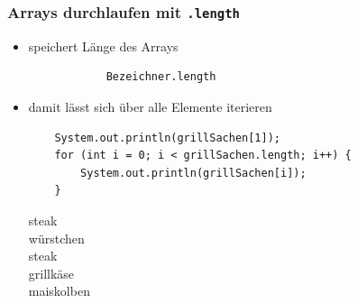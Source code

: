 \documentclass{../../presentation}
\begin{document}
\begin{frame}[fragile]
	\frametitle{Arrays durchlaufen mit \texttt{.length}}
	\begin{itemize}
		\item\pause speichert Länge des Arrays
		      \begin{verbatim}
			Bezeichner.length
		\end{verbatim}
		\item\pause damit lässt sich über alle Elemente iterieren
		      \begin{verbatim}
    System.out.println(grillSachen[1]);
    for (int i = 0; i < grillSachen.length; i++) {
        System.out.println(grillSachen[i]);
    }
    \end{verbatim}
		      \begin{ausgabe}
			      steak \\
			      würstchen \\
			      steak \\
			      grillkäse \\
			      maiskolben
		      \end{ausgabe}
	\end{itemize}
\end{frame}


\end{document}
